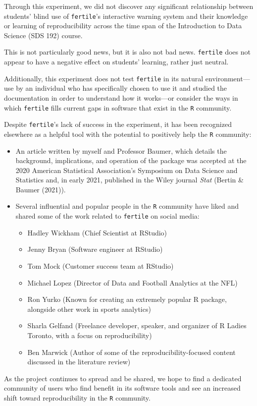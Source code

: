 \documentclass[12pt,twoside]{reedthesis}
\providecommand{\tightlist}{%
  \setlength{\itemsep}{0pt}\setlength{\parskip}{0pt}}
\begin{document}
Through this experiment, we did not discover any significant relationship between students' blind use of \texttt{fertile}'s interactive warning system and their knowledge or learning of reproducibility across the time span of the Introduction to Data Science (SDS 192) course.

This is not particularly good news, but it is also not bad news. \texttt{fertile} does not appear to have a negative effect on students' learning, rather just neutral.

Additionally, this experiment does not test \texttt{fertile} in its natural environment---use by an individual who has specifically chosen to use it and studied the documentation in order to understand how it works---or consider the ways in which \texttt{fertile} fills current gaps in software that exist in the \texttt{R} community.

Despite \texttt{fertile}'s lack of success in the experiment, it has been recognized elsewhere as a helpful tool with the potential to positively help the \texttt{R} community:
\begin{itemize}
\item
  An article written by myself and Professor Baumer, which details the background, implications, and operation of the package was accepted at the 2020 American Statistical Association's Symposium on Data Science and Statistics and, in early 2021, published in the Wiley journal \emph{Stat} (Bertin \& Baumer (2021)).
\item
  Several influential and popular people in the \texttt{R} community have liked and shared some of the work related to \texttt{fertile} on social media:
  \begin{itemize}
  \tightlist
  \item
    Hadley Wickham (Chief Scientist at RStudio)
  \item
    Jenny Bryan (Software engineer at RStudio)
  \item
    Tom Mock (Customer success team at RStudio)
  \item
    Michael Lopez (Director of Data and Football Analytics at the NFL)
  \item
    Ron Yurko (Known for creating an extremely popular R package, alongside other work in sports analytics)
  \item
    Sharla Gelfand (Freelance developer, speaker, and organizer of R Ladies Toronto, with a focus on reproducibility)
  \item
    Ben Marwick (Author of some of the reproducibility-focused content discussed in the literature review)
  \end{itemize}
\end{itemize}
As the project continues to spread and be shared, we hope to find a dedicated community of users who find benefit in its software tools and see an increased shift toward reproducibility in the \texttt{R} community.
\end{document}
